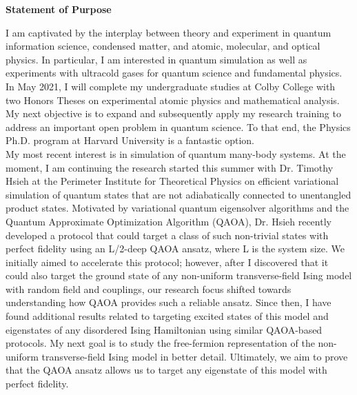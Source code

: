 \documentclass[12pt]{article}
\begin{document}
\begin{center}
	\textbf{Statement of Purpose}
\end{center}
I am captivated by the interplay between theory and experiment in quantum information science, condensed matter, and atomic, molecular, and optical physics. In particular, I am interested in  quantum simulation as well as experiments with ultracold gases for quantum science and fundamental physics. In May 2021, I will complete my undergraduate studies at Colby College with two Honors Theses on experimental atomic physics and mathematical analysis. My next objective is to expand and subsequently apply my research training to address an important open problem in quantum science. To that end, the Physics Ph.D. program at Harvard University is a fantastic option.  \\ 

My most recent interest is in simulation of quantum many-body systems. At the moment, I am continuing the research started this summer with Dr. Timothy Hsieh at the Perimeter Institute for Theoretical Physics on efficient variational simulation of quantum states that are not adiabatically connected to unentangled product states. Motivated by variational quantum eigensolver algorithms and the Quantum Approximate Optimization Algorithm (QAOA), Dr. Hsieh recently developed a protocol that could target a class of such non-trivial  states with perfect fidelity using an L/2-deep QAOA ansatz, where L is the system size. We initially aimed to accelerate this protocol; however, after I discovered that it could also target the ground state of any non-uniform transverse-field Ising model with random field and couplings, our research focus shifted towards understanding how QAOA provides such a reliable ansatz. Since then, I have found additional results related to targeting excited states of this model and eigenstates of any disordered Ising Hamiltonian using similar QAOA-based protocols. My next goal is to study the free-fermion representation of the non-uniform transverse-field Ising model in better detail. Ultimately, we aim to prove that the QAOA ansatz allows us to target any eigenstate of this model with perfect fidelity. \\
\end{document}
